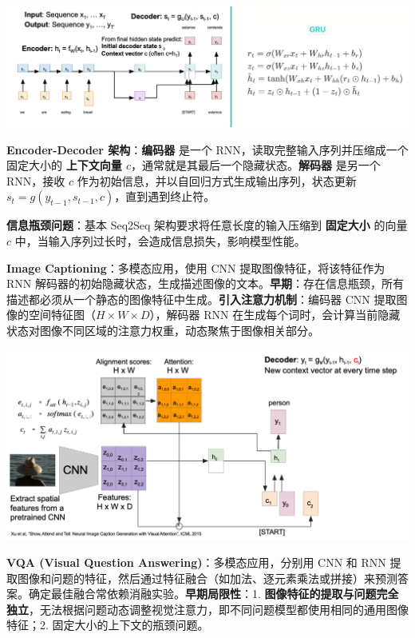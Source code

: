 \documentclass[
  8pt]{extarticle}
\begin{document}
\begin{multicols*}{4}
\includegraphics{./Cheatsheet-01-Sequential-Data.assets/image-20250618031316106.png}

\textbf{Encoder-Decoder 架构}：\textbf{编码器} 是一个
RNN，读取完整输入序列并压缩成一个固定大小的 \textbf{上下文向量
\(c\)}，通常就是其最后一个隐藏状态。\textbf{解码器} 是另一个 RNN，接收
\(c\) 作为初始信息，并以自回归方式生成输出序列，状态更新
\(s_t = g(y_{t-1}, s_{t-1}, c)\)，直到遇到终止符。

\textbf{信息瓶颈问题}：基本 Seq2Seq 架构要求将任意长度的输入压缩到
\textbf{固定大小} 的向量 \(c\)
中，当输入序列过长时，会造成信息损失，影响模型性能。

\textbf{Image Captioning}：多模态应用，使用 CNN
提取图像特征，将该特征作为 RNN
解码器的初始隐藏状态，生成描述图像的文本。\textbf{早期}：存在信息瓶颈，所有描述都必须从一个静态的图像特征中生成。\textbf{引入注意力机制}：编码器
CNN 提取图像的空间特征图（\(H \times W \times D\)），解码器 RNN
在生成每个词时，会计算当前隐藏状态对图像不同区域的注意力权重，动态聚焦于图像相关部分。

\includegraphics{./Cheatsheet-01-Sequential-Data.assets/image-20250617225104511.png}

\textbf{VQA (Visual Question Answering)}：多模态应用，分别用 CNN 和 RNN
提取图像和问题的特征，然后通过特征融合（如加法、逐元素乘法或拼接）来预测答案。确定最佳融合常依赖消融实验。\textbf{早期局限性}：1.
\textbf{图像特征的提取与问题完全独立}，无法根据问题动态调整视觉注意力，即不同问题模型都使用相同的通用图像特征；2.
固定大小的上下文的瓶颈问题。


\end{multicols*}
\end{document}
